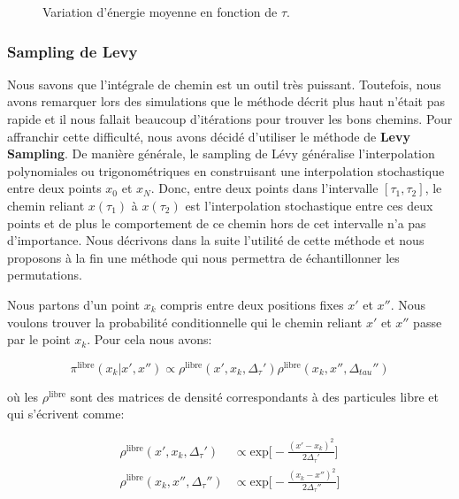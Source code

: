 \documentclass[11pt]{article}
\theoremstyle{definition}
\theoremstyle{remark}
\begin{document}
\begin{figure}[!h]
\centering

\caption{Variation d’énergie moyenne en fonction de $\tau$.}
\end{figure}

\subsubsection{Sampling de Levy} 

Nous savons que l’intégrale de chemin est un outil très puissant. Toutefois, nous avons remarquer lors des simulations que le méthode décrit plus haut n'était pas rapide et il nous fallait beaucoup d’itérations pour trouver les bons chemins. Pour affranchir cette difficulté, nous avons décidé d'utiliser le méthode de \textbf{Levy Sampling}. De manière générale, le sampling de Lévy généralise l’interpolation polynomiales ou trigonométriques en construisant une interpolation stochastique entre deux points $x_0$ et $x_N$. Donc, entre deux points dans l'intervalle $[\tau_1, \tau_2]$, le chemin reliant $x(\tau_1)$ à $x(\tau_2)$ est l'interpolation stochastique entre ces deux points et de plus le comportement de ce chemin hors de cet intervalle n'a pas d'importance. Nous décrivons dans la suite l'utilité de cette méthode et nous proposons à la fin une méthode qui nous permettra de échantillonner les permutations. 

Nous partons d'un point $x_k$ compris entre deux positions fixes $x'$ et $x''$. Nous voulons trouver la probabilité conditionnelle qui le chemin reliant $x'$ et $x''$ passe par le point $x_k$. Pour cela nous avons:

\begin{equation}
\label{proba_levy_1}
\pi^{\mathrm{libre}}(x_k|x',x'') \propto \rho^{\mathrm{libre}}(x', x_k, \Delta_{\tau}') \rho^{\mathrm{libre}}(x_k, x'', \Delta_{tau}'')
\end{equation} 

où les $\rho^{\mathrm{libre}}$ sont des matrices de densité correspondants à des particules libre et qui s'écrivent comme: 

\begin{align}
\label{rho_free_levy}
\rho^{\mathrm{libre}}(x', x_k, \Delta_{\tau}') &\propto \mathrm{exp}\Big[ - \frac{(x'-x_k)^2}{2\Delta_{\tau}'} \Big] \\
\rho^{\mathrm{libre}}(x_k, x'', \Delta_{\tau}'') &\propto \mathrm{exp}\Big[ - \frac{(x_k-x'')^2}{2\Delta_{\tau}''} \Big]
\end{align}
\end{document}
